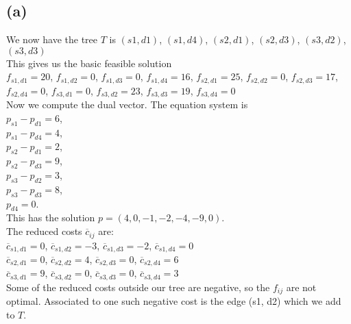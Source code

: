 \documentclass{article}
\theoremstyle{definition}
\begin{document}
\subsection*{(a)}
We now have the tree $T$ is $(s1, d1)$, $(s1, d4)$, $(s2, d1)$, $(s2, d3)$, $(s3, d2)$, $(s3, d3)$ \\
This gives us the basic feasible solution \\
$f_{s1,d1} = 20$, $f_{s1,d2} = 0$, $f_{s1,d3} = 0$, $f_{s1,d4} = 16$, $f_{s2,d1} = 25$, $f_{s2,d2} = 0$, $f_{s2,d3} = 17$, $f_{s2,d4} = 0$, $f_{s3,d1} = 0$, $f_{s3,d2} = 23$, $f_{s3,d3} = 19$, $f_{s3,d4} = 0$ \\
Now we compute the dual vector. The equation system is \\
$p_{s1} - p_{d1} = 6$, \\
$p_{s1} - p_{d4} = 4$, \\
$p_{s2} - p_{d1} = 2$, \\
$p_{s2} - p_{d3} = 9$, \\
$p_{s3} - p_{d2} = 3$, \\
$p_{s3} - p_{d3} = 8$, \\
$p_{d4} = 0$. \\
This has the solution $p = (4, 0, -1, -2, -4, -9, 0)$. \\
The reduced costs $\overline{{c}}_{{ij}}$ are: \\
$\overline{c}_{s1,d1} = 0$, $\overline{c}_{s1,d2} = -3$, $\overline{c}_{s1,d3} = -2$, $\overline{c}_{s1,d4} = 0$ \\ 
$\overline{c}_{s2,d1} = 0$, $\overline{c}_{s2,d2} = 4$, $\overline{c}_{s2,d3} = 0$, $\overline{c}_{s2,d4} = 6$ \\ 
$\overline{c}_{s3,d1} = 9$, $\overline{c}_{s3,d2} = 0$, $\overline{c}_{s3,d3} = 0$, $\overline{c}_{s3,d4} = 3$ \\
Some of the reduced costs outside our tree are negative, so the $f_{{ij}}$ are not optimal.
Associated to one such negative cost is the edge (s1, d2) which we add to $T$.
\end{document}
